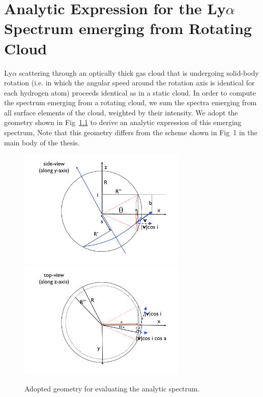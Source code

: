 
\chapter{Analytic Expression for the Ly$\alpha$ Spectrum emerging from Rotating Cloud}

\label{sec:app} %


Ly$\alpha$ scattering through an optically thick gas cloud that is
undergoing solid-body rotation (i.e. in which the angular speed around the
rotation axis is identical for each hydrogen atom) proceeds identical
as in a static cloud. In order to compute the spectrum emerging from a rotating cloud, we sum
the spectra emerging from all surface elements of the cloud, weighted by their intensity.
We adopt the geometry shown in Fig~\ref{fig:scheme} to derive an analytic expression of this emerging spectrum,
Note that this geometry differs from the scheme shown in Fig~1 in the main body of
the thesis.
%
\begin{figure}[h]
\centerline{\includegraphics[width=80mm]{../Figures/fig11a.pdf}
\includegraphics[width=80mm]{../Figures/fig11b.pdf}}
\caption[]{Adopted geometry for evaluating the analytic spectrum.}
\label{fig:scheme}
\end{figure}
